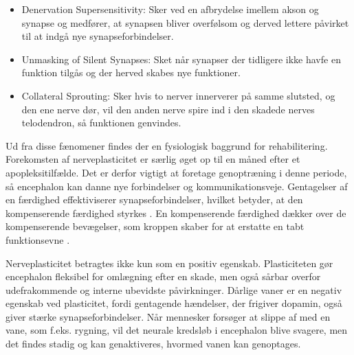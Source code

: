 \begin{itemize}
	\item Denervation Supersensitivity: Sker ved en afbrydelse imellem akson og synapse og medfører, at synapsen bliver overfølsom og derved lettere påvirket til at indgå nye synapseforbindelser.
	\item Unmasking of Silent Synapses: Sket når synapser der tidligere ikke havfe en funktion tilgås og der herved skabes nye funktioner.
	\item Collateral Sprouting: Sker hvis to nerver innerverer på samme slutsted, og den ene nerve dør, vil den anden nerve spire ind i den skadede nerves telodendron, så funktionen genvindes.
\end{itemize}

\noindent Ud fra disse fænomener findes der en fysiologisk baggrund for rehabilitering. Forekomsten af nerveplasticitet er særlig øget op til en måned efter et apopleksitilfælde. Det er derfor vigtigt at foretage genoptræning i denne periode, så encephalon kan danne nye forbindelser og kommunikationsveje. \cite{Rugnett2015} Gentagelser af en færdighed effektiviserer synapseforbindelser, hvilket betyder, at den kompenserende færdighed styrkes \cite{Stanfield2014}. En kompenserende færdighed dækker over de kompenserende bevægelser, som kroppen skaber for at erstatte en tabt funktionsevne \cite{Takeuchi2012,Leea2009}.

Nerveplasticitet betragtes ikke kun som en positiv egenskab. Plasticiteten gør encephalon fleksibel for omlægning efter en skade, men også sårbar overfor udefrakommende og interne ubevidste påvirkninger. Dårlige vaner er en negativ egenskab ved plasticitet, fordi gentagende hændelser, der frigiver dopamin, også giver stærke synapseforbindelser. Når mennesker forsøger at slippe af med en vane, som f.eks. rygning, vil det neurale kredsløb i encephalon blive svagere, men det findes stadig og kan genaktiveres, hvormed vanen kan genoptages. \cite{Hampton2015}



